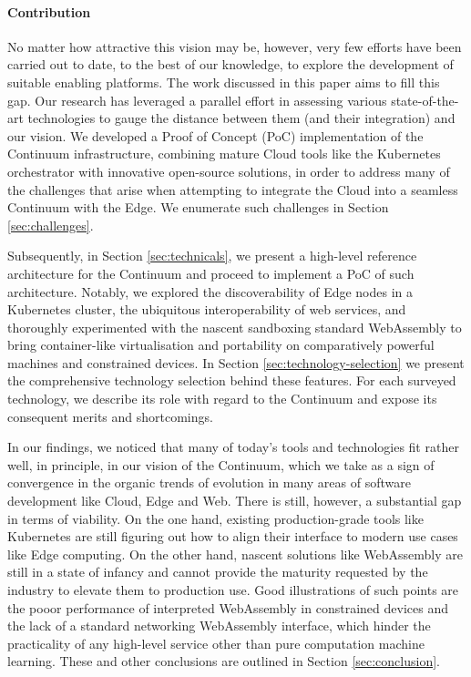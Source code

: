 \paragraph{Contribution}

No matter how attractive this vision may be, however, very few efforts have been carried out to date, to the best of our knowledge, to explore the development of suitable enabling platforms. The work discussed in this paper aims to fill this gap. 
Our research has leveraged a parallel effort in assessing various state-of-the-art technologies to gauge the distance between them (and their integration) and our vision. 
We developed a Proof of Concept (PoC) implementation of the Continuum infrastructure, combining mature Cloud tools like the Kubernetes \cite{kubernetes} orchestrator with innovative open-source solutions, in order to address many of the challenges that arise when attempting to integrate the Cloud into a seamless Continuum with the Edge. We enumerate such challenges in Section \ref{sec:challenges}.

Subsequently, in Section \ref{sec:technicals}, we present a high-level reference architecture for the Continuum and proceed to implement a PoC of such architecture. Notably, we explored the discoverability of Edge nodes in a Kubernetes cluster, the ubiquitous interoperability of web services, and thoroughly experimented with the nascent sandboxing standard WebAssembly \cite{haas2017bringing} to bring container-like virtualisation and portability on comparatively powerful machines and constrained devices. In Section \ref{sec:technology-selection} we present the comprehensive technology selection behind these features. For each surveyed technology, we describe its role with regard to the Continuum and expose its consequent merits and shortcomings. 

In our findings, we noticed that many of today's tools and technologies fit rather well, in principle, in our vision of the Continuum, which we take as a sign of convergence in the organic trends of evolution in many areas of software development like Cloud, Edge and Web. There is still, however, a substantial gap in terms of viability. On the one hand, existing production-grade tools like Kubernetes are still figuring out how to align their interface to modern use cases like Edge computing. On the other hand, nascent solutions like WebAssembly are still in a state of infancy and cannot provide the maturity requested by the industry to elevate them to production use. Good illustrations of such points are the pooor performance of interpreted WebAssembly in constrained devices and the lack of a standard networking WebAssembly interface, which hinder the practicality of any high-level service other than pure computation machine learning. These and other conclusions are outlined in Section \ref{sec:conclusion}.

